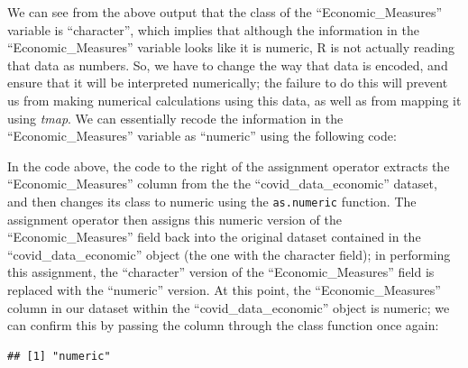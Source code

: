 \documentclass[
]{article}
\newenvironment{Shaded}{\begin{snugshade}}{\end{snugshade}}
\newcommand{\CommentTok}[1]{\textcolor[rgb]{0.56,0.35,0.01}{\textit{#1}}}
\newcommand{\FunctionTok}[1]{\textcolor[rgb]{0.00,0.00,0.00}{#1}}
\newcommand{\NormalTok}[1]{#1}
\newcommand{\OtherTok}[1]{\textcolor[rgb]{0.56,0.35,0.01}{#1}}
\newcommand{\SpecialCharTok}[1]{\textcolor[rgb]{0.00,0.00,0.00}{#1}}
\begin{document}
We can see from the above output that the class of the ``Economic\_Measures'' variable is ``character'', which implies that although the information in the ``Economic\_Measures'' variable looks like it is numeric, R is not actually reading that data as numbers. So, we have to change the way that data is encoded, and ensure that it will be interpreted numerically; the failure to do this will prevent us from making numerical calculations using this data, as well as from mapping it using \emph{tmap}. We can essentially recode the information in the ``Economic\_Measures'' variable as ``numeric'' using the following code:

\begin{Shaded}
\end{Shaded}

In the code above, the code to the right of the assignment operator extracts the ``Economic\_Measures'' column from the the ``covid\_data\_economic'' dataset, and then changes its class to numeric using the \texttt{as.numeric} function. The assignment operator then assigns this numeric version of the ``Economic\_Measures'' field back into the original dataset contained in the ``covid\_data\_economic'' object (the one with the character field); in performing this assignment, the ``character'' version of the ``Economic\_Measures'' field is replaced with the ``numeric'' version. At this point, the ``Economic\_Measures'' column in our dataset within the ``covid\_data\_economic'' object is numeric; we can confirm this by passing the column through the class function once again:

\begin{Shaded}
\end{Shaded}

\begin{verbatim}
## [1] "numeric"
\end{verbatim}
\end{document}
